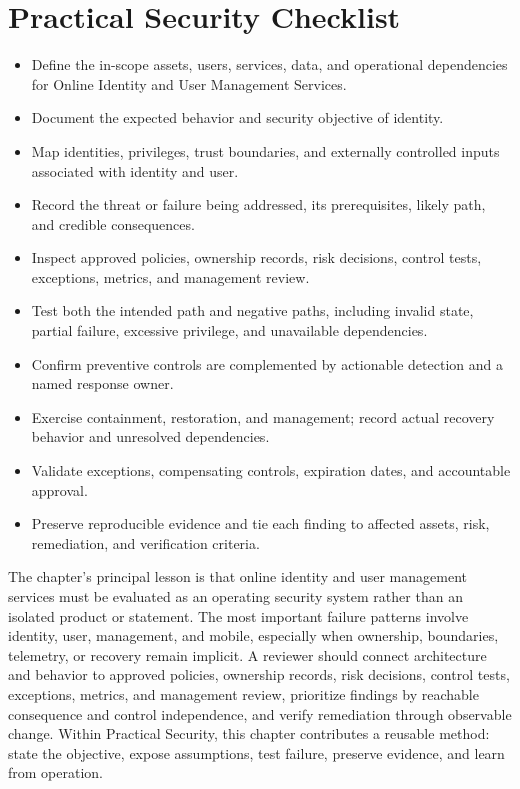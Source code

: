 \documentclass[11pt]{article}
\begin{document}
\section*{Practical Security Checklist}
\begin{itemize}[label=$\square$]
\item Define the in-scope assets, users, services, data, and operational dependencies for Online Identity and User Management Services.
\item Document the expected behavior and security objective of identity.
\item Map identities, privileges, trust boundaries, and externally controlled inputs associated with identity and user.
\item Record the threat or failure being addressed, its prerequisites, likely path, and credible consequences.
\item Inspect approved policies, ownership records, risk decisions, control tests, exceptions, metrics, and management review.
\item Test both the intended path and negative paths, including invalid state, partial failure, excessive privilege, and unavailable dependencies.
\item Confirm preventive controls are complemented by actionable detection and a named response owner.
\item Exercise containment, restoration, and management; record actual recovery behavior and unresolved dependencies.
\item Validate exceptions, compensating controls, expiration dates, and accountable approval.
\item Preserve reproducible evidence and tie each finding to affected assets, risk, remediation, and verification criteria.
\end{itemize}
\begin{synthesisbox}
The chapter's principal lesson is that online identity and user management services must be evaluated as an operating security system rather than an isolated product or statement. The most important failure patterns involve identity, user, management, and mobile, especially when ownership, boundaries, telemetry, or recovery remain implicit. A reviewer should connect architecture and behavior to approved policies, ownership records, risk decisions, control tests, exceptions, metrics, and management review, prioritize findings by reachable consequence and control independence, and verify remediation through observable change. Within Practical Security, this chapter contributes a reusable method: state the objective, expose assumptions, test failure, preserve evidence, and learn from operation.
\end{synthesisbox}
\end{document}
